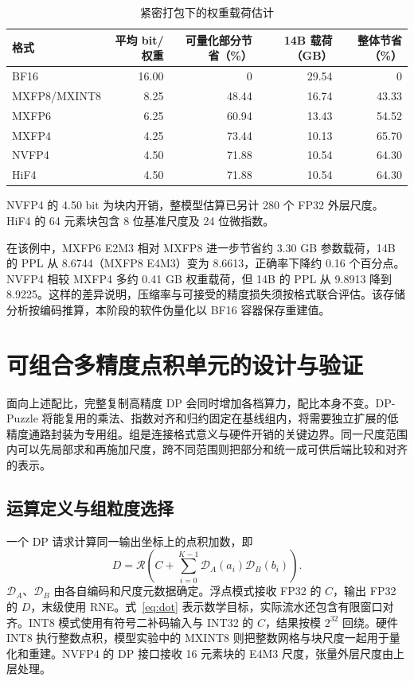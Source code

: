 \documentclass[10.5pt,compsoc,UTF8]{CjC}
\newcommand{\tabnote}[1]{\par\smallskip\begin{minipage}{\linewidth}\zihao{5-}#1\end{minipage}}
\begin{document}
\begin{table}[htbp]
\centering
\caption{紧密打包下的权重载荷估计}
\label{tab:storage}
\begin{tabular}{@{}lrrrr@{}}
\toprule
格式 & 平均 bit/权重 & 可量化部分节省（\%） & 14B 载荷（GB） & 整体节省（\%） \\
\midrule
BF16           & 16.00 & 0     & 29.54 & 0 \\
MXFP8/MXINT8   &  8.25 & 48.44 & 16.74 & 43.33 \\
MXFP6          &  6.25 & 60.94 & 13.43 & 54.52 \\
MXFP4          &  4.25 & 73.44 & 10.13 & 65.70 \\
NVFP4          &  4.50 & 71.88 & 10.54 & 64.30 \\
HiF4           &  4.50 & 71.88 & 10.54 & 64.30 \\
\bottomrule
\end{tabular}
\tabnote{NVFP4 的 4.50 bit 为块内开销，整模型估算已另计 280 个 FP32 外层尺度。HiF4 的 64 元素块包含 8 位基准尺度及 24 位微指数。}
\end{table}

在该例中，MXFP6 E2M3 相对 MXFP8 进一步节省约 3.30 GB 参数载荷，14B 的 PPL 从 8.6744（MXFP8 E4M3）变为 8.6613，正确率下降约 0.16 个百分点。NVFP4 相较 MXFP4 多约 0.41 GB 权重载荷，但 14B 的 PPL 从 9.8913 降到 8.9225。这样的差异说明，压缩率与可接受的精度损失须按格式联合评估。该存储分析按编码推算，本阶段的软件伪量化以 BF16 容器保存重建值。

\section{可组合多精度点积单元的设计与验证}
\label{sec:dp}

面向上述配比，完整复制高精度 DP 会同时增加各档算力，配比本身不变。DP-Puzzle 将能复用的乘法、指数对齐和归约固定在基线组内，将需要独立扩展的低精度通路封装为专用组。组是连接格式意义与硬件开销的关键边界。同一尺度范围内可以先局部求和再施加尺度，跨不同范围则把部分和统一成可供后端比较和对齐的表示。

\subsection{运算定义与组粒度选择}

一个 DP 请求计算同一输出坐标上的点积加数，即
\begin{equation}
  D=\mathcal{R}\left(C+\sum_{i=0}^{K-1}\mathcal{D}_A(a_i)\mathcal{D}_B(b_i)\right).
  \label{eq:dot}
\end{equation}
$\mathcal{D}_A$、$\mathcal{D}_B$ 由各自编码和尺度元数据确定。浮点模式接收 FP32 的 $C$，输出 FP32 的 $D$，末级使用 RNE。式~\eqref{eq:dot} 表示数学目标，实际流水还包含有限窗口对齐。INT8 模式使用有符号二补码输入与 INT32 的 $C$，结果按模 $2^{32}$ 回绕。硬件 INT8 执行整数点积，模型实验中的 MXINT8 则把整数网格与块尺度一起用于量化和重建。NVFP4 的 DP 接口接收 16 元素块的 E4M3 尺度，张量外层尺度由上层处理。
\end{document}
